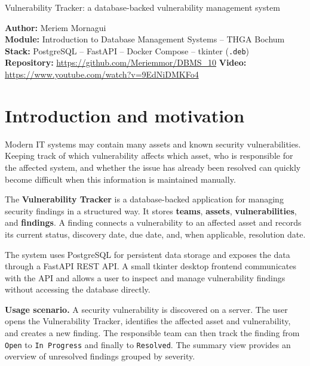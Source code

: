 \documentclass[11pt,a4paper]{article}
\begin{document}
\thispagestyle{empty}

%
{Vulnerability Tracker: a database-backed vulnerability management system}

\begin{infobox}
\textbf{Author:} Meriem Mornagui \\
\textbf{Module:} Introduction to Database Management Systems -- THGA Bochum \\
\textbf{Stack:} PostgreSQL -- FastAPI -- Docker Compose -- tkinter (\texttt{.deb}) \\
\textbf{Repository:} \url{https://github.com/Meriemmor/DBMS_10}
\textbf{Video:} \url{https://www.youtube.com/watch?v=9EdNiDMKFo4}
\end{infobox}

\tableofcontents
\newpage

\section{Introduction and motivation}

Modern IT systems may contain many assets and known security vulnerabilities.
Keeping track of which vulnerability affects which asset, who is responsible
for the affected system, and whether the issue has already been resolved can
quickly become difficult when this information is maintained manually.

The \textbf{Vulnerability Tracker} is a database-backed application for managing
security findings in a structured way. It stores \textbf{teams},
\textbf{assets}, \textbf{vulnerabilities}, and \textbf{findings}. A finding
connects a vulnerability to an affected asset and records its current status,
discovery date, due date, and, when applicable, resolution date.

The system uses PostgreSQL for persistent data storage and exposes the data
through a FastAPI REST API. A small tkinter desktop frontend communicates with
the API and allows a user to inspect and manage vulnerability findings without
accessing the database directly.

\begin{beispielbox}
\textbf{Usage scenario.} A security vulnerability is discovered on a server.
The user opens the Vulnerability Tracker, identifies the affected asset and
vulnerability, and creates a new finding. The responsible team can then track
the finding from \texttt{Open} to \texttt{In Progress} and finally to
\texttt{Resolved}. The summary view provides an overview of unresolved
findings grouped by severity.
\end{beispielbox}
\end{document}
